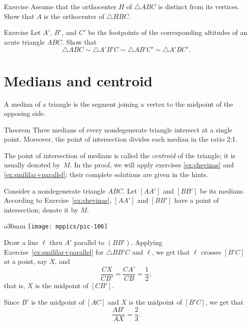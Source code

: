 \begin{thm}{Exercise}\label{ex:orthic-4}
Assume that the orthocenter $H$ of $\triangle ABC$ is distinct from its vertices.
Show that $A$ is the orthocenter of $\triangle H B C$.
\end{thm}

\begin{thm}{Exercise}\label{ex:orthic-sim}
Let $A'$, $B'$, and $C'$ be the footpoints of the corresponding altitudes of an acute triangle $ABC$.
Show that
\[
\triangle ABC \sim \triangle A'B'C \sim \triangle AB'C' \sim \triangle A'BC'.
\]
\end{thm}



\section{Medians and centroid}

A median of a triangle is the segment joining a vertex to the midpoint of the opposing side. 

\begin{thm}{Theorem}\label{thm:centroid}
Three medians of every nondegenerate triangle intersect at a single point.
Moreover, the point of intersection divides each median in the ratio 2:1.
\end{thm}

The point of intersection of medians is called the \emph{centroid} of the triangle; 
it is usually denoted by~$M$.
In the proof, we will apply exercises \ref{ex:chevinas} and \ref{ex:smililar+parallel}; their complete solutions are given in the hints.

Consider a nondegenerate triangle $A B C$.
Let $[A A']$ and $[B B']$ be its medians.
According to Exercise~\ref{ex:chevinas}, 
$[A A']$ and $[B B']$ have a point of intersection;
denote it by $M$.

\begin{wrapfigure}{o}{36mm}
\vskip-4mm
\centering
\texttt{[image: mppics/pic-106]}
\end{wrapfigure}

Draw a line $\ell$ thru $A'$ parallel to $(BB')$.
Applying Exercise~\ref{ex:smililar+parallel} for $\triangle BB'C$ and $\ell$, we get that $\ell$ crosses $[B'C]$ at a point, say $X$, and
\[\frac{CX}{CB'}=\frac{CA'}{CB}=\frac12;\]
that is, $X$ is the midpoint of $[CB']$.

Since $B'$ is the midpoint of $[AC]$ and $X$ is the midpoint of $[B'C]$, we get that 
\[\frac{AB'}{AX}=\frac23.\]

